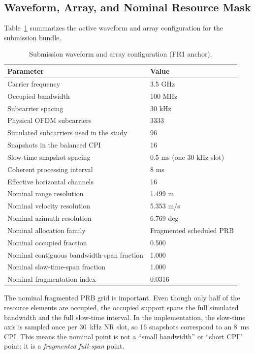 \documentclass[11pt]{article}
\begin{document}
\subsection{Waveform, Array, and Nominal Resource Mask}

Table~\ref{tab:waveform-setup} summarizes the active waveform and array configuration for the submission bundle.

\begin{table}[H]
\centering
\small
\caption{Submission waveform and array configuration (FR1 anchor).}
\label{tab:waveform-setup}
\begin{tabular}{>{\raggedright\arraybackslash}p{2.7in}p{2.7in}}
\toprule
Parameter & Value \\
\midrule
Carrier frequency & 3.5 GHz \\
Occupied bandwidth & 100 MHz \\
Subcarrier spacing & 30 kHz \\
Physical OFDM subcarriers & 3333 \\
Simulated subcarriers used in the study & 96 \\
Snapshots in the balanced CPI & 16 \\
Slow-time snapshot spacing & 0.5 ms (one 30 kHz slot) \\
Coherent processing interval & 8 ms \\
Effective horizontal channels & 16 \\
Nominal range resolution & 1.499 m \\
Nominal velocity resolution & 5.353 m/s \\
Nominal azimuth resolution & 6.769 deg \\
Nominal allocation family & Fragmented scheduled PRB \\
Nominal occupied fraction & 0.500 \\
Nominal contiguous bandwidth-span fraction & 1.000 \\
Nominal slow-time-span fraction & 1.000 \\
Nominal fragmentation index & 0.0316 \\
\bottomrule
\end{tabular}
\end{table}

The nominal fragmented PRB grid is important. Even though only half of the resource elements are occupied, the occupied support spans the full simulated bandwidth and the full slow-time interval. In the implementation, the slow-time axis is sampled once per 30~kHz NR slot, so 16 snapshots correspond to an 8~ms CPI. This means the nominal point is not a ``small bandwidth'' or ``short CPI'' point; it is a \emph{fragmented full-span} point.
\end{document}
